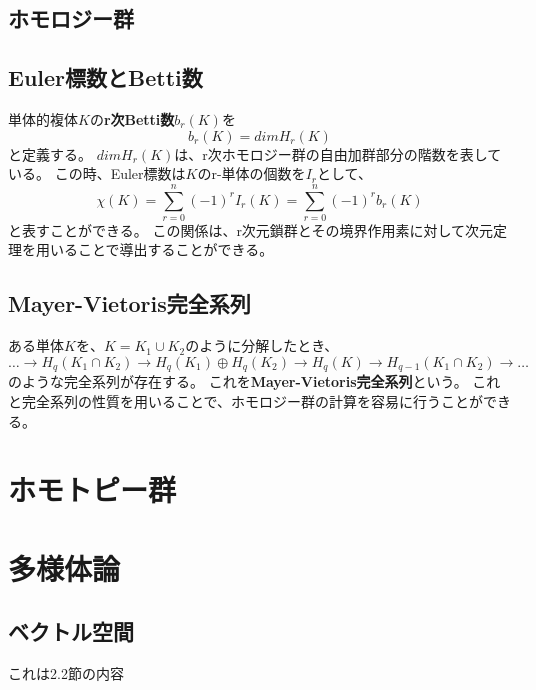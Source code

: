 \documentclass[a4paper]{jsreport}
\begin{document}
        \section{ホモロジー群}


        \section{Euler標数とBetti数}
            単体的複体$K$の\textbf{r次Betti数}$b_r(K)$を
            \begin{equation}
                b_r(K) = dim H_r(K)
            \end{equation}
            と定義する。
            $dim H_r(K)$は、r次ホモロジー群の自由加群部分の階数を表している。
            この時、Euler標数は$K$のr-単体の個数を$I_r$として、
            \begin{equation}
                \chi(K) = \sum_{r=0}^{n} (-1)^r I_r(K) = \sum_{r=0}^{n} (-1)^r b_r(K)
            \end{equation}
            と表すことができる。
            この関係は、r次元鎖群とその境界作用素に対して次元定理を用いることで導出することができる。

        \section{Mayer-Vietoris完全系列}
            ある単体$K$を、$K = K_1 \cup K_2$のように分解したとき、
            \begin{equation}
                \dots \rightarrow H_q(K_1 \cap K_2) \rightarrow H_q(K_1) \oplus H_q(K_2) \rightarrow H_q(K) \rightarrow H_{q-1}(K_1 \cap K_2) \rightarrow \dots
            \end{equation}
            のような完全系列が存在する。
            これを\textbf{Mayer-Vietoris完全系列}という。
            これと完全系列の性質を用いることで、ホモロジー群の計算を容易に行うことができる。

    \chapter{ホモトピー群}


    \chapter{多様体論}
        \section{ベクトル空間}
            これは2.2節の内容
\end{document}
